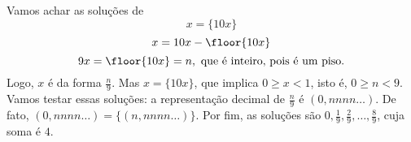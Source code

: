 Vamos achar as soluções de
$$ x = \{10x\}$$
$$ x = 10x - \floor{10x} $$
$$ 9x = \floor{10x} = n, \text{ que é inteiro, pois é um piso.}$$
Logo, $x$ é da forma $\frac{n}{9}$. Mas $x = \{10x\}$, que implica $0 \ge x < 1$, isto é, $0 \ge n < 9$.
Vamos testar essas soluções: a representação decimal de $\frac{n}{9}$ é $(0,nnnn\dots)$. De fato, $(0,nnnn\dots) = \{(n,nnnn\dots)\}$.
Por fim, as soluções são $0, \frac{1}{9}, \frac{2}{9}, \dots, \frac{8}{9}$, cuja soma é $4$.
